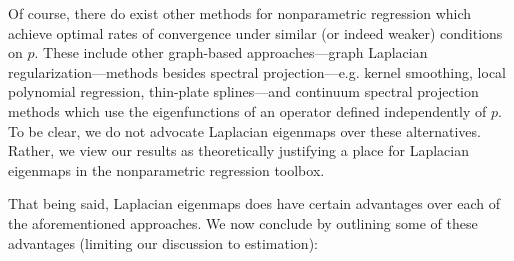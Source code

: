\documentclass[aos]{imsart}
\theoremstyle{plain}
\theoremstyle{definition}
\theoremstyle{remark}
\newcommand{\1}{\mathbf{1}}
\begin{document}
Of course, there do exist other methods for nonparametric regression which achieve optimal rates of convergence under similar (or indeed weaker) conditions on $p$. These include other graph-based approaches---graph Laplacian regularization---methods besides spectral projection---e.g. kernel smoothing, local polynomial regression, thin-plate splines---and continuum spectral projection methods which use the eigenfunctions of an operator defined independently of $p$. To be clear, we do not advocate Laplacian eigenmaps over these alternatives. Rather, we view our results as theoretically justifying a place for Laplacian eigenmaps in the nonparametric regression toolbox. 

That being said, Laplacian eigenmaps does have certain advantages over each of the aforementioned approaches. We now conclude by outlining some of these advantages (limiting our discussion to estimation):
\end{document}
